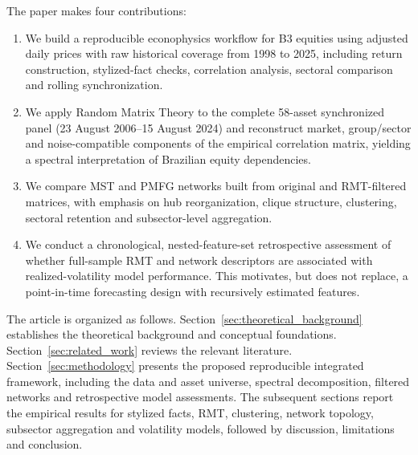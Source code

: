 The paper makes four contributions:
\begin{enumerate}
  \item We build a reproducible econophysics workflow for B3 equities using adjusted daily prices with raw historical coverage from 1998 to 2025, including return construction, stylized-fact checks, correlation analysis, sectoral comparison and rolling synchronization.
  \item We apply Random Matrix Theory to the complete 58-asset synchronized panel (23 August 2006--15 August 2024) and reconstruct market, group/sector and noise-compatible components of the empirical correlation matrix, yielding a spectral interpretation of Brazilian equity dependencies.
  \item We compare MST and PMFG networks built from original and RMT-filtered matrices, with emphasis on hub reorganization, clique structure, clustering, sectoral retention and subsector-level aggregation.
  \item We conduct a chronological, nested-feature-set retrospective assessment of whether full-sample RMT and network descriptors are associated with realized-volatility model performance. This motivates, but does not replace, a point-in-time forecasting design with recursively estimated features.
\end{enumerate}

The article is organized as follows. Section~\ref{sec:theoretical_background} establishes the theoretical background and conceptual foundations. Section~\ref{sec:related_work} reviews the relevant literature. Section~\ref{sec:methodology} presents the proposed reproducible integrated framework, including the data and asset universe, spectral decomposition, filtered networks and retrospective model assessments. The subsequent sections report the empirical results for stylized facts, RMT, clustering, network topology, subsector aggregation and volatility models, followed by discussion, limitations and conclusion.
